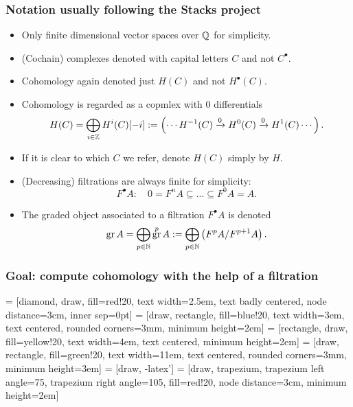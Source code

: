 \documentclass[notheorems, hyperref={backref}]{beamer}
\theoremstyle{darkgreentheorem}
\theoremstyle{darkbluedefinition}
\theoremstyle{darkredexample}
\theoremstyle{remark}
\DeclareMathOperator{\gr}{gr}
\begin{document}
\begin{frame}
    \frametitle{Notation usually following the Stacks project \cite{stacks}}
	\begin{itemize}
	    \item Only finite dimensional vector spaces over $\mathbb{Q}$ for simplicity.
		\pause
	    \item (Cochain) complexes denoted with capital letters $C$ and not $C^{\bullet}$.
		\pause
	    \item Cohomology again denoted just $H(C)$ and not $H^{\bullet}(C)$.
		\pause
	    \item Cohomology is regarded as a copmlex with $0$ differentials
		\[ H(C)=\bigoplus_{i\in \mathbb{Z}}H^{i}(C)[-i]:=\left(\cdots H^{-1}(C)\xrightarrow{0} H^{0}(C)\xrightarrow{0}H^{1}(C) \cdots \right). \]
		\pause
	    \item If it is clear to which $C$ we refer, denote $H(C)$ simply by $H$.
		\pause
	    \item (Decreasing) filtrations are always finite for simplicity:
		\[ F^{\bullet}A \colon \quad 0=F^{n}A\subseteq \ldots \subseteq F^{0}A=A. \]
		\pause
	    \item The graded object associated to a filtration $F^{\bullet}A$ is denoted
		\[ \gr{A}=\bigoplus_{p\in \N} \gr^{p}A:=\bigoplus_{p\in \N}\left( F^{p}A/F^{p+1}A \right). \]
	\end{itemize}
\end{frame}

\begin{frame}
    \frametitle{Goal: compute cohomology with the help of a filtration}
 = [diamond, draw, fill=red!20, 
    text width=2.5em, text badly centered, node distance=3cm, inner sep=0pt]
 = [draw, rectangle, fill=blue!20, 
    text width=3em, text centered, rounded corners=3mm, minimum height=2em]
 = [rectangle, draw, fill=yellow!20, 
    text width=4em, text centered, minimum height=2em]
 = [draw, rectangle, fill=green!20, 
    text width=11em, text centered, rounded corners=3mm, minimum height=3em]
 = [draw, -latex']
 = [draw, trapezium, trapezium left angle=75, trapezium right angle=105, fill=red!20, node distance=3cm,
    minimum height=2em]
\begin{center}
\end{center}
\end{frame}
\end{document}
